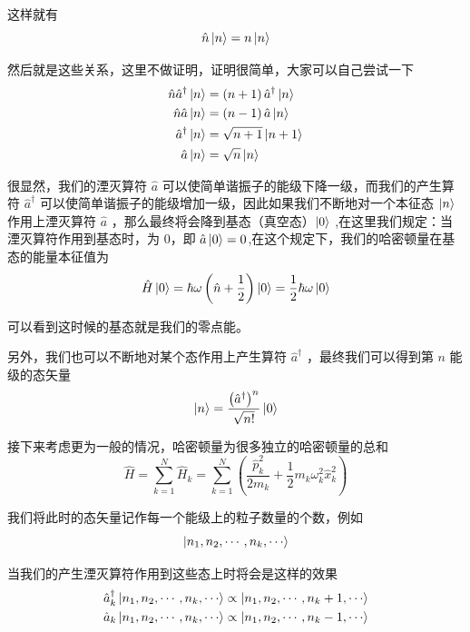 这样就有
\begin{equation*}
    \hat{n}\ket{n} = n\ket{n}
\end{equation*}


然后就是这些关系，这里不做证明，证明很简单，大家可以自己尝试一下
\begin{align*}
    \hat{n}\hat{a}^\dagger\ket{n} &= \left(n + 1\right) \hat{a}^\dagger\ket{n} \\
    \hat{n}\hat{a}\ket{n} &= \left(n - 1\right) \hat{a}\ket{n} \\
    \hat{a}^\dagger \ket{n} &= \sqrt{n + 1}\ket{n + 1} \\
    \hat{a} \ket{n} &= \sqrt{n} \ket{n}
\end{align*}

很显然，我们的湮灭算符 $\hat{a}$ 可以使简单谐振子的能级下降一级，而我们的产生算符 $\hat{a}^\dagger$ 可以使简单谐振子的能级增加一级，因此如果我们不断地对一个本征态 $\ket{n}$ 作用上湮灭算符 $\hat{a}$ ，那么最终将会降到基态（真空态）$\ket{0}$ ,在这里我们规定：当湮灭算符作用到基态时，为 $0$，即 $\displaystyle \hat{a}\ket{0} = 0$,在这个规定下，我们的哈密顿量在基态的能量本征值为
\begin{equation*}
    \hat{H} \ket{0} = \hbar\omega \left(\hat{n} + \frac{1}{2}\right) \ket{0} = \frac{1}{2}\hbar\omega \ket{0}
\end{equation*}

可以看到这时候的基态就是我们的零点能。

另外，我们也可以不断地对某个态作用上产生算符 $\hat{a}^\dagger$ ，最终我们可以得到第 $n$ 能级的态矢量
\begin{equation*}
    \ket{n} = \frac{\left(\hat{a}^\dagger\right)^n}{\sqrt{n!}}\ket{0}
\end{equation*}

接下来考虑更为一般的情况，哈密顿量为很多独立的哈密顿量的总和
\begin{equation*}
    \hat{H} = \sum_{k = 1}^{N} \hat{H}_k =\sum_{k = 1}^{N} \left(\frac{\hat{p}_k^2}{2m_k} + \frac{1}{2} m_k \omega_k^2 \hat{x}_k^2\right)
\end{equation*}

我们将此时的态矢量记作每一个能级上的粒子数量的个数，例如
\begin{equation*}
    \ket{n_1,n_2,\cdots,n_k,\cdots}
\end{equation*}

当我们的产生湮灭算符作用到这些态上时将会是这样的效果
\begin{align*}
    \hat{a}_k^\dagger \ket{n_1,n_2,\cdots,n_k,\cdots} &\propto \ket{n_1,n_2,\cdots,n_k + 1,\cdots} \\
    \hat{a}_k \ket{n_1,n_2,\cdots,n_k,\cdots} &\propto \ket{n_1,n_2,\cdots,n_k - 1,\cdots}
\end{align*}

